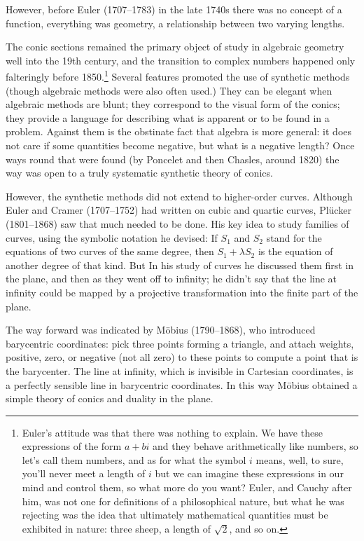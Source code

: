 However, before Euler (1707--1783) in the late 1740s there was no concept of a function, everything was geometry, a relationship between two varying lengths.

The conic sections remained the primary object of study in algebraic geometry well into the 19th century, and
the transition to complex numbers happened only falteringly before 1850.\footnote{Euler's attitude was that there was nothing to explain. We have these expressions of the form $a+bi$ and they behave arithmetically like numbers, so let's call them numbers, and as for what the symbol $i$ means, well, to sure, you'll never meet a length of $i$ but we can imagine these expressions in our mind and control them, so what more do you want? Euler, and Cauchy after him, was not one for definitions of a philosophical nature, but what he was rejecting was the idea that ultimately mathematical quantities must be exhibited in nature: three sheep, a length of $\sqrt{2}$, and so on.} Several features promoted the use of synthetic methods (though algebraic methods were also often used.)  They can be elegant when algebraic methods are blunt; they correspond to the visual form of the conics; they provide a language for describing what is apparent or to be found in a problem. Against them is the obstinate fact that algebra is more general: it does not care if some quantities become negative, but what is a negative length? Once ways round that were found (by Poncelet and then Chasles, around 1820) the way was open to a truly systematic synthetic theory of conics. 

However, the synthetic methods did not extend to higher-order curves.  Although Euler and Cramer (1707--1752) had written on cubic and quartic curves, Pl\"ucker (1801--1868) saw that much needed to be done. His key idea to study families of curves, using the symbolic notation he devised: If $S_1$ and $S_2$ stand for the equations of two curves of the same degree, then $S_1 + \lambda S_2$ is the equation of another degree of that kind. But In his study of curves he discussed them first in  the plane, and then as they went off to infinity; he didn't say that the line at infinity could be mapped by a projective transformation into the finite part of the plane.

The way forward was indicated by M\"obius (1790--1868), who introduced barycentric coordinates: pick three points forming a triangle, and attach weights, positive, zero, or negative (not all zero) to these points to compute a point that is the barycenter.  The line at infinity, which is invisible in Cartesian coordinates, is a perfectly sensible line in barycentric coordinates. In this way M\"obius obtained a simple theory of conics and duality in the plane.  

